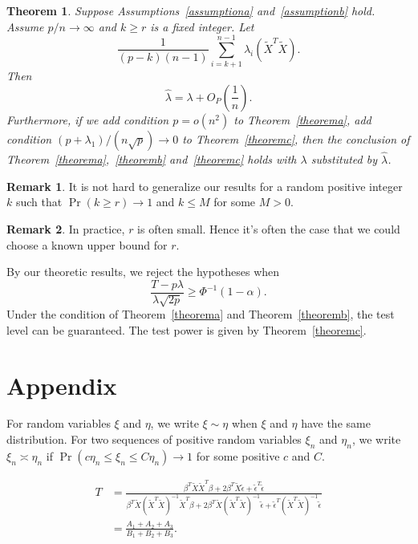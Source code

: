 \documentclass[review]{elsarticle}
\theoremstyle{plain}
\newtheorem{theorem}{\quad\quad Theorem}
\theoremstyle{definition}
\newtheorem{remark}{\quad\quad Remark}
\theoremstyle{remark}
\begin{document}
\begin{theorem}\label{theoremLambda}
    Suppose Assumptions~\ref{assumptiona} and~\ref{assumptionb} hold.
    Assume $p/n \to  \infty$ and $k\geq r$ is a fixed integer. Let
     \begin{equation}
    \frac{1}{(p-k)(n-1)}\sum_{i=k+1}^{n-1}\lambda_{i}(\tilde{X}^T\tilde{X}).
     \end{equation}
     Then
    \begin{equation}
        \hat{\lambda}=\lambda +O_P(\frac{1}{n}).
    \end{equation}
    Furthermore, if we add condition $p=o(n^2)$ to Theorem~\ref{theorema}, add condition ${(p+\lambda_1)}/{(n\sqrt{p})}\to 0$ to Theorem~\ref{theoremc}, then
    the conclusion of Theorem~\ref{theorema},~\ref{theoremb} and~\ref{theoremc} holds with $\lambda$ substituted by $\hat{\lambda}$.
\end{theorem}
\begin{remark}
It is not hard to generalize our results for  a random positive integer $k$ such that $\Pr(k\geq r)\to 1$ and $k\leq M$ for some $M>0$.
\end{remark}
\begin{remark}
In practice, $r$ is often small. Hence it's often the case that we could choose a known upper bound for $r$.
\end{remark}
By our theoretic results, we reject the hypotheses when 
\begin{equation}
    \frac{T-p\lambda}{\lambda\sqrt{2p}}\geq \Phi^{-1}(1-\alpha).
\end{equation}
Under the condition of Theorem~\ref{theorema} and Theorem~\ref{theoremb}, the test level can be guaranteed. The test power is given by Theorem~\ref{theoremc}.

\section{Appendix}

For random variables $\xi$ and $\eta$, we write $\xi\sim \eta$ when $\xi$ and $\eta$ have the same distribution. For two sequences of positive random variables $\xi_n$ and $\eta_n$, we write $\xi_n\asymp \eta_n$ if $\Pr(c\eta_n\leq\xi_n\leq C\eta_n)\to 1$ for some positive $c$ and $C$.

\begin{equation}\label{Tdecom}
    \begin{aligned}
        T&=\frac{\beta^T \tilde{X}\tilde{X}^T \beta+
        2\beta^T \tilde{X}\tilde{\epsilon}+
        \tilde{\epsilon}^T\tilde{\epsilon}
    }{\beta^T \tilde{X}{(\tilde{X}^T\tilde{X})}^{-1}\tilde{X}^T \beta+
        2\beta^T \tilde{X}{(\tilde{X}^T\tilde{X})}^{-1}\tilde{\epsilon}+
        \tilde{\epsilon}^T{(\tilde{X}^T\tilde{X})}^{-1}\tilde{\epsilon}
    }\\
        &=\frac{A_1+A_2+A_3}{B_1+B_2+B_3}.
    \end{aligned}
\end{equation}
\end{document}

